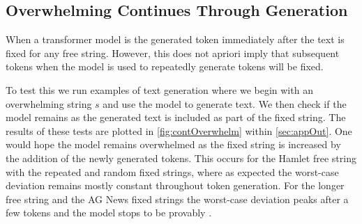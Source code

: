 \subsection{Overwhelming Continues Through Generation}
When a transformer model is \overwQ the generated token immediately after the text is fixed for any free string. However, this does not apriori imply that subsequent tokens when the model is used to repeatedly generate tokens will be fixed. 

To test this we run examples of text generation where we begin with an overwhelming string $s$ and use the model to generate text. We then check if the model remains \overwQ as the generated text is included as part of the fixed string. The results of these tests are plotted in \cref{fig:contOverwhelm} within \cref{sec:appOut}. One would hope the model remains overwhelmed as the fixed string is increased by the addition of the newly generated tokens. This occurs for the Hamlet free string with the repeated and random fixed strings, where as expected the worst-case deviation remains mostly constant throughout token generation. For the longer free string and the AG News fixed strings the worst-case deviation peaks after a few tokens and the model stops to be provably \overwQ.
